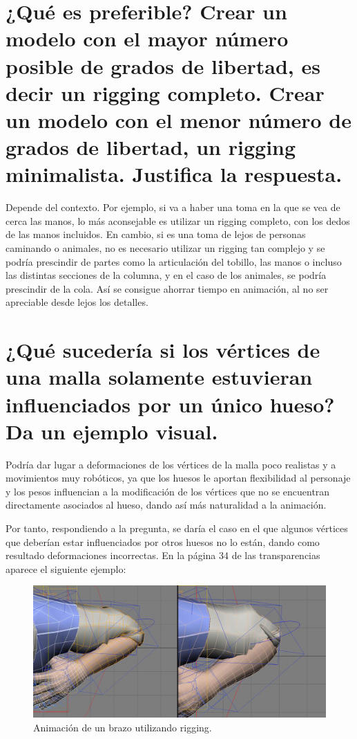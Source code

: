 \documentclass{article}
\begin{document}
\section{¿Qué es preferible? Crear un modelo con el mayor número posible de grados de libertad, es decir un rigging completo. Crear un modelo con el menor número de grados de libertad, un rigging minimalista. Justifica la respuesta.}

Depende del contexto. Por ejemplo, si va a haber una toma en la que se vea de cerca las manos, lo más aconsejable es utilizar un rigging completo, con los dedos de las manos incluidos. En cambio, si es una toma de lejos de personas caminando o animales, no es necesario utilizar un rigging tan complejo y se podría prescindir de partes como la articulación del tobillo, las manos o incluso las distintas secciones de la columna, y en el caso de los animales, se podría prescindir de la cola. Así se consigue ahorrar tiempo en animación, al no ser apreciable desde lejos los detalles.

\section{¿Qué sucedería si los vértices de una malla solamente estuvieran influenciados por un único hueso? Da un ejemplo visual.}

Podría dar lugar a deformaciones de los vértices de la malla poco realistas y a movimientos muy robóticos, ya que los huesos le aportan flexibilidad al personaje y los pesos influencian a la modificación de los vértices que no se encuentran directamente asociados al hueso, dando así más naturalidad a la animación.

\bigskip

Por tanto, respondiendo a la pregunta, se daría el caso en el que algunos vértices que deberían estar influenciados por otros huesos no lo están, dando como resultado deformaciones incorrectas. En la página 34 de las transparencias aparece el siguiente ejemplo:


\begin{figure}[H]
   \centering
   \includegraphics[width=\textwidth]{imagenes/pag34.png}
   \caption{Animación de un brazo utilizando rigging\cite{diapos}.}
\end{figure}
\end{document}
